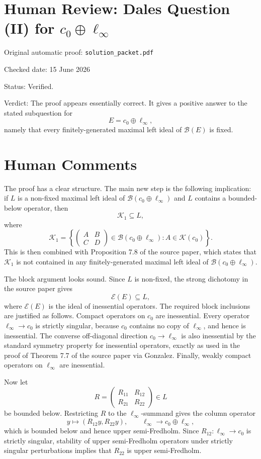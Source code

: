 \documentclass[11pt]{article}
\begin{document}
\section*{Human Review: Dales Question (II) for \(c_0\oplus\ell_\infty\)}

\noindent Original automatic proof: \texttt{solution\_packet.pdf}

\noindent Checked date: 15 June 2026

\noindent Status: Verified.

\noindent Verdict: The proof appears essentially correct. It gives a positive answer to the stated subquestion for
\[
E=c_0\oplus\ell_\infty,
\]
namely that every finitely-generated maximal left ideal of \(\mathcal B(E)\) is fixed.

\section*{Human Comments}

The proof has a clear structure. The main new step is the following implication: if \(L\) is a non-fixed maximal left ideal of \(\mathcal B(c_0\oplus\ell_\infty)\) and \(L\) contains a bounded-below operator, then
\[
\mathcal K_1\subseteq L,
\]
where
\[
\mathcal K_1=
\left\{
\begin{pmatrix}
A&B\\
C&D
\end{pmatrix}\in\mathcal B(c_0\oplus\ell_\infty): A\in\mathcal K(c_0)
\right\}.
\]
This is then combined with Proposition 7.8 of the source paper, which states that \(\mathcal K_1\) is not contained in any finitely-generated maximal left ideal of \(\mathcal B(c_0\oplus\ell_\infty)\).

The block argument looks sound. Since \(L\) is non-fixed, the strong dichotomy in the source paper gives
\[
\mathcal E(E)\subseteq L,
\]
where \(\mathcal E(E)\) is the ideal of inessential operators. The required block inclusions are justified as follows. Compact operators on \(c_0\) are inessential. Every operator \(\ell_\infty\to c_0\) is strictly singular, because \(c_0\) contains no copy of \(\ell_\infty\), and hence is inessential. The converse off-diagonal direction \(c_0\to\ell_\infty\) is also inessential by the standard symmetry property for inessential operators, exactly as used in the proof of Theorem 7.7 of the source paper via Gonzalez. Finally, weakly compact operators on \(\ell_\infty\) are inessential.

Now let
\[
R=
\begin{pmatrix}
R_{11}&R_{12}\\
R_{21}&R_{22}
\end{pmatrix}\in L
\]
be bounded below. Restricting \(R\) to the \(\ell_\infty\)-summand gives the column operator
\[
y\mapsto (R_{12}y,R_{22}y),
\qquad
\ell_\infty\to c_0\oplus\ell_\infty,
\]
which is bounded below and hence upper semi-Fredholm. Since \(R_{12}:\ell_\infty\to c_0\) is strictly singular, stability of upper semi-Fredholm operators under strictly singular perturbations implies that \(R_{22}\) is upper semi-Fredholm.
\end{document}
